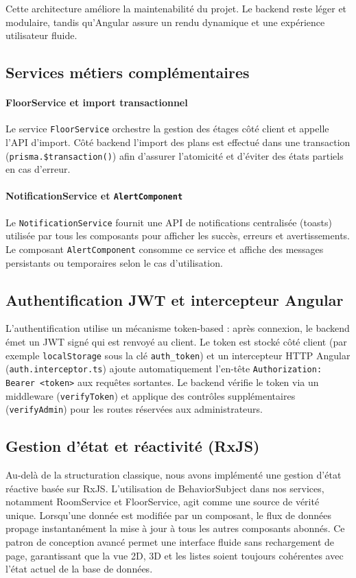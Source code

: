 Cette architecture améliore la maintenabilité du projet. Le backend reste léger et modulaire, tandis qu'Angular assure un rendu dynamique et une expérience utilisateur fluide.

\subsection{Services métiers complémentaires}
\paragraph{FloorService et import transactionnel} Le service \texttt{FloorService} orchestre la gestion des étages côté client et appelle l'API d'import. Côté backend l'import des plans est effectué dans une transaction (\texttt{prisma.\$transaction()}) afin d'assurer l'atomicité et d'éviter des états partiels en cas d'erreur.

\paragraph{NotificationService et \texttt{AlertComponent}} Le \texttt{NotificationService} fournit une API de notifications centralisée (toasts) utilisée par tous les composants pour afficher les succès, erreurs et avertissements. Le composant \texttt{AlertComponent} consomme ce service et affiche des messages persistants ou temporaires selon le cas d'utilisation.

\subsection{Authentification JWT et intercepteur Angular}
L'authentification utilise un mécanisme token-based : après connexion, le backend émet un JWT signé qui est renvoyé au client. Le token est stocké côté client (par exemple \texttt{localStorage} sous la clé \texttt{auth\_token}) et un intercepteur HTTP Angular (\texttt{auth.interceptor.ts}) ajoute automatiquement l'en-tête \texttt{Authorization: Bearer <token>} aux requêtes sortantes. Le backend vérifie le token via un middleware (\texttt{verifyToken}) et applique des contrôles supplémentaires (\texttt{verifyAdmin}) pour les routes réservées aux administrateurs.

\subsection{Gestion d'état et réactivité (RxJS)}
Au-delà de la structuration classique, nous avons implémenté une gestion d'état réactive basée sur RxJS. L'utilisation de BehaviorSubject dans nos services, notamment RoomService et FloorService, agit comme une source de vérité unique. Lorsqu'une donnée est modifiée par un composant, le flux de données propage instantanément la mise à jour à tous les autres composants abonnés. Ce patron de conception avancé permet une interface fluide sans rechargement de page, garantissant que la vue 2D, 3D et les listes soient toujours cohérentes avec l'état actuel de la base de données.

